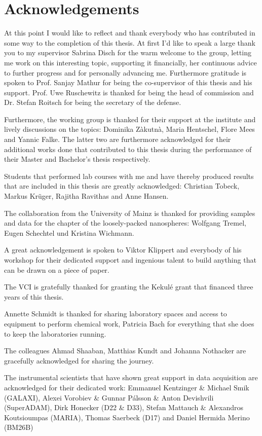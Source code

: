 \documentclass[\main/dresen_thesis.tex]{subfiles}
\begin{document}
	\section*{Acknowledgements}
	At this point I would like to reflect and thank everybody who has contributed in some way to the completion of this thesis.
	At first I'd like to speak a large thank you to my supervisor Sabrina Disch for the warm welcome to the group, letting me work on this interesting topic, supporting it financially, her continuous advice to further progress and for personally advancing me.
	Furthermore gratitude is spoken to Prof. Sanjay Mathur for being the co-supervisor of this thesis and his support.
	Prof. Uwe Ruschewitz is thanked for being the head of commission and Dr. Stefan Roitsch for being the secretary of the defense.

	Furthermore, the working group is thanked for their support at the institute and lively discussions on the topics: Dominika Zàkutnà, Maria Hentschel, Flore Mees and Yannic Falke.
	The latter two are furthermore acknowledged for their additional works done that contributed to this thesis during the performance of their Master and Bachelor's thesis respectively.

	Students that performed lab courses with me and have thereby produced results that are included in this thesis are greatly acknowledged: Christian Tobeck, Markus Kr\"uger, Rajitha Ravithas and Anne Hansen.

	The collaboration from the University of Mainz is thanked for providing samples and data for the chapter of the loosely-packed nanospheres: Wolfgang Tremel, Eugen Schechtel und Kristina Wichmann.

	A great acknowledgement is spoken to Viktor Klippert and everybody of his workshop for their dedicated support and ingenious talent to build anything that can be drawn on a piece of paper.

	The VCI is gratefully thanked for granting the Kekulé grant that financed three years of this thesis.

	Annette Schmidt is thanked for sharing laboratory spaces and access to equipment to perform chemical work, Patricia Bach for everything that she does to keep the laboratories running.

	The colleagues Ahmad Shaaban, Matthias Kundt and Johanna Nothacker are gracefully acknowledged for sharing the journey.

	The instrumental scientists that have shown great support in data acquisition are acknowledged for their dedicated work:
	Emmanuel Kentzinger \& Michael Smik (GALAXI), Alexei Vorobiev \& Gunnar Pálsson \& Anton Devishvili (SuperADAM), Dirk Honecker (D22 \& D33), Stefan Mattauch \& Alexandros Koutsioumpas (MARIA), Thomas Saerbeck (D17) and Daniel Hermida Merino (BM26B)
\end{document}
